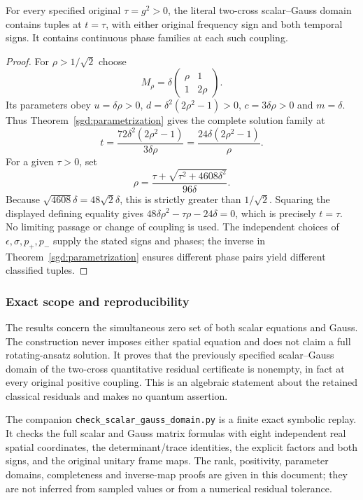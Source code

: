 \begin{corollary}
\label{sgd:every-coupling}
For every specified original $\tau=g^2>0$, the literal two-cross
scalar--Gauss domain contains tuples at $t=\tau$, with either original
frequency sign and both temporal signs. It contains continuous phase
families at each such coupling.
\end{corollary}
\begin{proof}
For $\rho>1/\sqrt2$ choose
\[
 M_\rho=\delta\begin{pmatrix}\rho&1\\1&2\rho\end{pmatrix}.
\]
Its parameters obey $u=\delta\rho>0$,
$d=\delta^2(2\rho^2-1)>0$, $c=3\delta\rho>0$ and $m=\delta$.
Thus Theorem~\ref{sgd:parametrization} gives the complete solution
family at
\[
 t=\frac{72\delta^2(2\rho^2-1)}{3\delta\rho}
   =\frac{24\delta(2\rho^2-1)}\rho.
\]
For a given $\tau>0$, set
\[
 \rho=\frac{\tau+\sqrt{\tau^2+4608\delta^2}}{96\delta}.
\]
Because $\sqrt{4608}\delta=48\sqrt2\delta$, this is strictly
greater than $1/\sqrt2$. Squaring the displayed defining equality
gives $48\delta\rho^2-\tau\rho-24\delta=0$, which is precisely
$t=\tau$. No limiting passage or change of coupling is used.
The independent choices of $\epsilon,\sigma,p_+,p_-$ supply the
stated signs and phases; the inverse in Theorem~\ref{sgd:parametrization}
ensures different phase pairs yield different classified tuples.
\end{proof}

\subsubsection{Exact scope and reproducibility}

The results concern the simultaneous zero set of both scalar equations
and Gauss. The construction never imposes either spatial equation and
does not claim a full rotating-ansatz solution. It proves that the
previously specified scalar--Gauss domain of the two-cross quantitative
residual certificate is nonempty, in fact at every original positive
coupling. This is an algebraic statement about the retained classical
residuals and makes no quantum assertion.

The companion \texttt{check\_scalar\_gauss\_domain.py} is a finite exact
symbolic replay. It checks the full scalar and Gauss matrix formulas with
eight independent real spatial coordinates, the determinant/trace
identities, the explicit factors and both signs, and the original
unitary frame maps. The rank, positivity, parameter domains, completeness
and inverse-map proofs are given in this document; they are not inferred
from sampled values or from a numerical residual tolerance.

